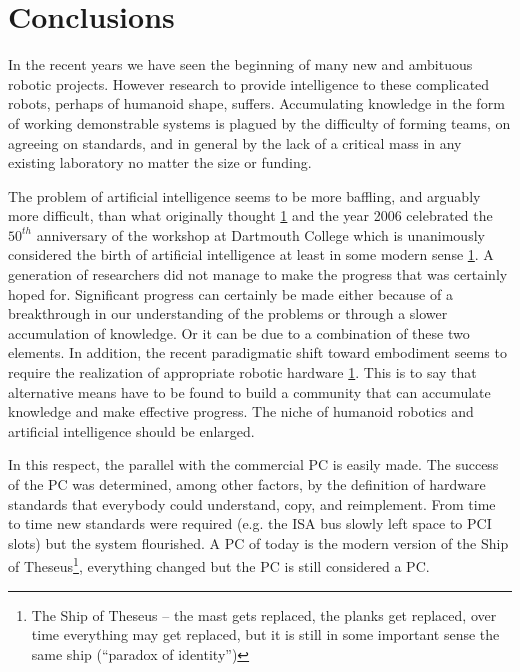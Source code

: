 
\section{Conclusions}
In the recent years we have seen the beginning of many new and 
ambituous robotic projects. However research to provide intelligence 
to these complicated robots, perhaps of humanoid shape, suffers. 
Accumulating knowledge in the form of working demonstrable systems is 
plagued by the difficulty of forming teams, on agreeing on standards, and 
in general by the lack of a critical mass in any existing laboratory no 
matter the size or funding. 

The problem of artificial intelligence seems to be more baffling, and 
arguably more difficult, than what originally thought \ref{} and the year 2006 
celebrated the $50^{th}$ anniversary of the workshop at Dartmouth College
which is unanimously considered the birth of artificial intelligence at 
least in some modern sense \ref{}. %
A generation of researchers did not manage to make the progress that was
certainly hoped for. Significant progress can certainly be made either 
because of a breakthrough in our understanding of the problems or through 
a slower accumulation of knowledge. Or it can be due to a combination of 
these two elements. In addition, the recent paradigmatic shift toward 
embodiment seems to require the realization of appropriate robotic 
hardware \ref{}. 
This is to say that alternative means have to be found to build a community
that can accumulate knowledge and make effective progress. The niche of
humanoid robotics and artificial intelligence should be enlarged.

In this respect, the parallel with the commercial PC is easily made. 
The success of the PC was determined, among other factors, by the definition 
of hardware standards that everybody could understand, copy, and reimplement. 
From time to time new standards were required (e.g. the ISA bus slowly left
space to PCI slots) but the system flourished. A PC of today is the modern 
version of the Ship of Theseus\footnote{The Ship of 
Theseus -- the mast gets replaced,
the planks get replaced, over time everything may get replaced,
but it is still in some important sense the same ship (``paradox
of identity'')}, everything changed but the PC is still considered
a PC. 
%

